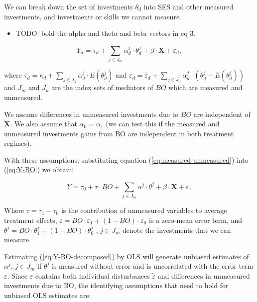 \documentclass[
]{article}
\providecommand{\tightlist}{%
  \setlength{\itemsep}{0pt}\setlength{\parskip}{0pt}}
\begin{document}
We can break down the set of investments \(\theta_d\) into SES and other
measured investments, and investments or skills we cannot measure.

\begin{itemize}
\tightlist
\item
  TODO: bold the alpha and theta and beta vectors in eq 3.
\end{itemize}

\begin{equation}
Y_d=\tau_d +\sum_{j\in J_m} \alpha_d^j \cdot \theta_d^j + \beta \cdot \textbf{X}+\varepsilon_d,  \label{eq:measured-unmeasured}
\end{equation}

where \(\tau_d=\kappa_d+\sum_{j\in J_u} \alpha_d^j \cdot E(\theta_d^j)\)
and
\(\varepsilon_d=\tilde{\varepsilon_d}+\sum_{j\in J_u} \alpha_d^j \cdot (\theta_d^j-E(\theta_d^j))\)
and \(J_m\) and \(J_u\) are the index sets of mediators of \(BO\) which are
measured and unmeasured.

We assume differences in unmeasured investments due to \(BO\) are
independent of \(\textbf{X}\). We also assume that \(\alpha_0 = \alpha_1\)
(we can test this if the measured and unmeasured investments gains from
BO are independent in both treatment regimes).

With these assumptions, substituting equation
(\ref{eq:measured-unmeasured}) into (\ref{eq:Y-BO}) we obtain:

\begin{equation}
Y=\tau_0 +\tau \cdot BO+ \sum_{j\in J_m} \alpha^j \cdot \theta^j + \beta \cdot \textbf{X}+\varepsilon,  \label{eq:Y-BO-decomposed}
\end{equation}

Where \(\tau=\tau_1-\tau_0\) is the contribution of unmeasured variables
to average treatment effects,
\(\varepsilon = BO \cdot \varepsilon_1 + (1-BO)\cdot \varepsilon_0\) is a
zero-mean error term, and
\(\theta^j = BO \cdot \theta_1^j + (1-BO)\cdot \theta_0^j\) , \(j\in J_m\)
denote the investments that we can measure.

Estimating (\ref{eq:Y-BO-decomposed}) by OLS will generate unbiased
estimates of \(\alpha^j\), \(j\in J_m\) if \(\theta^j\) is measured without
error and is uncorrelated with the error term \(\varepsilon\). Since
\(\varepsilon\) contains both individual disturbances
\(\tilde{\varepsilon}\) and differences in unmeasured investments due to
BO, the identifying assumptions that need to hold for unbiased OLS
estimates are:
\end{document}
